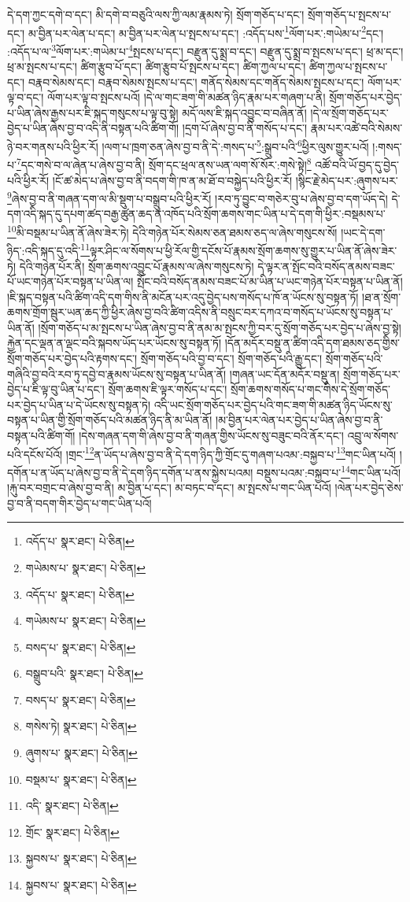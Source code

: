 དེ་དག་ཀྱང་དགེ་བ་དང་། མི་དགེ་བ་བཅུའི་ལས་ཀྱི་ལམ་རྣམས་ཏེ། སྲོག་གཅོད་པ་དང་། སྲོག་གཅོད་པ་སྤངས་པ་དང་། མ་བྱིན་པར་ལེན་པ་དང་། མ་བྱིན་པར་ལེན་པ་སྤངས་པ་དང་། :འདོད་པས་\footnote{འདོད་པ་  སྣར་ཐང་།  པེ་ཅིན། }ལོག་པར་:གཡེམ་པ་\footnote{གཡེམས་པ་  སྣར་ཐང་།  པེ་ཅིན། }དང་། :འདོད་པ་ལ་\footnote{འདོད་པ་  སྣར་ཐང་།  པེ་ཅིན། }ལོག་པར་:གཡེམ་པ་\footnote{གཡེམས་པ་  སྣར་ཐང་།  པེ་ཅིན། }སྤངས་པ་དང་། བརྫུན་དུ་སྨྲ་བ་དང་། བརྫུན་དུ་སྨྲ་བ་སྤངས་པ་དང་། ཕྲ་མ་དང་། ཕྲ་མ་སྤངས་པ་དང་། ཚིག་རྩུབ་པོ་དང་། ཚིག་རྩུབ་པོ་སྤངས་པ་དང་། ཚིག་ཀྱལ་པ་དང་། ཚིག་ཀྱལ་པ་སྤངས་པ་དང་། བརྣབ་སེམས་དང་། བརྣབ་སེམས་སྤངས་པ་དང་། གནོད་སེམས་དང་གནོད་སེམས་སྤངས་པ་དང་། ལོག་པར་ལྟ་བ་དང་། ལོག་པར་ལྟ་བ་སྤངས་པའོ། །དེ་ལ་གང་ཟག་གི་མཚན་ཉིད་རྣམ་པར་གཞག་པ་ནི། སྲོག་གཅོད་པར་བྱེད་པ་ཡིན་ཞེས་རྒྱས་པར་ཇི་སྐད་གསུངས་པ་ལྟ་བུ་སྟེ། མདོ་ལས་ཇི་སྐད་འབྱུང་བ་བཞིན་ནོ། །དེ་ལ་སྲོག་གཅོད་པར་བྱེད་པ་ཡིན་ཞེས་བྱ་བ་འདི་ནི་བསྟན་པའི་ཚིག་གོ། །དྲག་པོ་ཞེས་བྱ་བ་ནི་གསོད་པ་དང་། རྣམ་པར་འཚེ་བའི་སེམས་ཉེ་བར་གནས་པའི་ཕྱིར་རོ། །ལག་པ་ཁྲག་ཅན་ཞེས་བྱ་བ་ནི་དེ་:གསད་པ་\footnote{བསད་པ་  སྣར་ཐང་།  པེ་ཅིན། }:སྒྲུབ་པའི་\footnote{བསྒྲུབ་པའི་  སྣར་ཐང་།  པེ་ཅིན། }ཕྱིར་ལུས་གྱུར་པའོ། །:གསད་པ་\footnote{བསད་པ་  སྣར་ཐང་།  པེ་ཅིན། }དང་གསེ་བ་ལ་ཞེན་པ་ཞེས་བྱ་བ་ནི། སྲོག་དང་ཕྲལ་ནས་ཡན་ལག་སོ་སོར་:གསེ་སྟེ།\footnote{གསེས་ཏེ།  སྣར་ཐང་།  པེ་ཅིན། } འཚོ་བའི་ཡོ་བྱད་དུ་བྱེད་པའི་ཕྱིར་རོ། །ངོ་ཚ་མེད་པ་ཞེས་བྱ་བ་ནི་བདག་གི་ཁ་ན་མ་ཐོ་བ་བསྐྱེད་པའི་ཕྱིར་རོ། །སྙིང་རྗེ་མེད་པར་:ཞུགས་པར་\footnote{ཞུགས་པ་  སྣར་ཐང་།  པེ་ཅིན། }ཞེས་བྱ་བ་ནི་གཞན་དག་ལ་མི་སྡུག་པ་བསྒྲུབ་པའི་ཕྱིར་རོ། །རབ་ཏུ་བྱུང་བ་གཅེར་བུ་པ་ཞེས་བྱ་བ་དག་ཡོད་དེ། དེ་དག་འདི་སྐད་དུ་དཔག་ཚད་བརྒྱ་ཚུན་ཆད་ན་འཁོད་པའི་སྲོག་ཆགས་གང་ཡིན་པ་དེ་དག་གི་ཕྱིར་:བསྡམས་པ་\footnote{བསྡམ་པ་  སྣར་ཐང་།  པེ་ཅིན། }མི་བསྡམ་པ་ཡིན་ནོ་ཞེས་ཟེར་ཏེ། དེའི་གཉེན་པོར་སེམས་ཅན་ཐམས་ཅད་ལ་ཞེས་གསུངས་སོ། །ཡང་དེ་དག་ཉིད་:འདི་སྐད་དུ་འདི་\footnote{འདི་  སྣར་ཐང་།  པེ་ཅིན། }ལྟར་ཤིང་ལ་སོགས་པ་ཕྱི་རོལ་གྱི་དངོས་པོ་རྣམས་སྲོག་ཆགས་སུ་གྱུར་པ་ཡིན་ནོ་ཞེས་ཟེར་ཏེ། དེའི་གཉེན་པོར་ནི། སྲོག་ཆགས་འབྱུང་པོ་རྣམས་ལ་ཞེས་གསུངས་ཏེ། དེ་ལྟར་ན་སྤོང་བའི་བསོད་ནམས་བཟང་པོ་ཡང་གཉེན་པོར་བསྟན་པ་ཡིན་ལ། སྤོང་བའི་བསོད་ནམས་བཟང་པོ་མ་ཡིན་པ་ཡང་གཉེན་པོར་བསྟན་པ་ཡིན་ནོ། །ཇི་སྐད་བསྟན་པའི་ཚིག་འདི་དག་གིས་ནི་མངོན་པར་འདུ་བྱེད་པས་གསོད་པ་ཁོ་ན་ཡོངས་སུ་བསྟན་ཏོ། །ཐ་ན་སྲོག་ཆགས་གྲོག་སྦུར་ཡན་ཆད་ཀྱི་ཕྱིར་ཞེས་བྱ་བའི་ཚིག་འདིས་ནི་བསྲུང་བར་དཀའ་བ་གསོད་པ་ཡོངས་སུ་བསྟན་པ་ཡིན་ནོ། །སྲོག་གཅོད་པ་མ་སྤངས་པ་ཡིན་ཞེས་བྱ་བ་ནི་ནམ་མ་སྤངས་ཀྱི་བར་དུ་སྲོག་གཅོད་པར་བྱེད་པ་ཞེས་བྱ་སྟེ། རྐྱེན་དང་ལྡན་ན་ལྡང་བའི་སྐབས་ཡོད་པར་ཡོངས་སུ་བསྟན་ཏོ། །དོན་མདོར་བསྡུ་ན་ཚིག་འདི་དག་ཐམས་ཅད་གྱིས་སྲོག་གཅོད་པར་བྱེད་པའི་རྟགས་དང་། སྲོག་གཅོད་པའི་བྱ་བ་དང་། སྲོག་གཅོད་པའི་རྒྱུ་དང་། སྲོག་གཅོད་པའི་གཞིའི་བྱ་བའི་རབ་ཏུ་དབྱེ་བ་རྣམས་ཡོངས་སུ་བསྟན་པ་ཡིན་ནོ། །གཞན་ཡང་དོན་མདོར་བསྡུ་ན། སྲོག་གཅོད་པར་བྱེད་པ་ཇི་ལྟ་བུ་ཡིན་པ་དང་། སྲོག་ཆགས་ཇི་ལྟར་གསོད་པ་དང་། སྲོག་ཆགས་གསོད་པ་གང་གིས་དེ་སྲོག་གཅོད་པར་བྱེད་པ་ཡིན་པ་དེ་ཡོངས་སུ་བསྟན་ཏེ། འདི་ཡང་སྲོག་གཅོད་པར་བྱེད་པའི་གང་ཟག་གི་མཚན་ཉིད་ཡོངས་སུ་བསྟན་པ་ཡིན་གྱི་སྲོག་གཅོད་པའི་མཚན་ཉིད་ནི་མ་ཡིན་ནོ། །མ་བྱིན་པར་ལེན་པར་བྱེད་པ་ཡིན་ཞེས་བྱ་བ་ནི་བསྟན་པའི་ཚིག་གོ། །དེས་གཞན་དག་གི་ཞེས་བྱ་བ་ནི་གཞན་གྱིས་ཡོངས་སུ་བཟུང་བའི་ནོར་དང་། འབྲུ་ལ་སོགས་པའི་དངོས་པོའོ། །གྲང་\footnote{གྲོང་  སྣར་ཐང་།  པེ་ཅིན། }ན་ཡོད་པ་ཞེས་བྱ་བ་ནི་དེ་དག་ཉིད་ཀྱི་གྲོང་དུ་གཞག་པའམ་:བསྐྱབ་པ་\footnote{སྐྱབས་པ་  སྣར་ཐང་།  པེ་ཅིན། }གང་ཡིན་པའོ། །དགོན་པ་ན་ཡོད་པ་ཞེས་བྱ་བ་ནི་དེ་དག་ཉིད་དགོན་པ་ནས་སྐྱེས་པའམ། བསྡུས་པའམ་:བསྐྱབ་པ་\footnote{སྐྱབས་པ་  སྣར་ཐང་།  པེ་ཅིན། }གང་ཡིན་པའོ། །རྐུ་བར་བགྲང་བ་ཞེས་བྱ་བ་ནི། མ་བྱིན་པ་དང་། མ་བཏང་བ་དང་། མ་སྤངས་པ་གང་ཡིན་པའོ། །ལེན་པར་བྱེད་ཅེས་བྱ་བ་ནི་བདག་གིར་བྱེད་པ་གང་ཡིན་པའོ། 